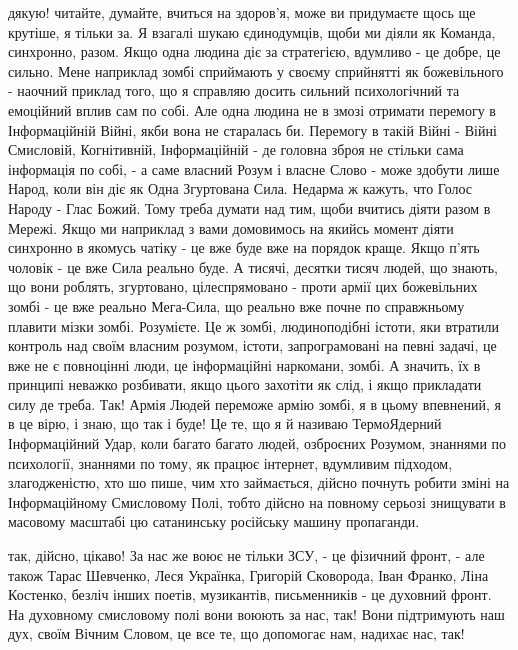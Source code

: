 дякую! читайте, думайте, вчиться на здоров'я, може ви придумаєте щось ще
крутіше, я тільки за. Я взагалі шукаю єдинодумців, щоби ми діяли як Команда,
синхронно, разом. Якщо одна людина діє за стратегією, вдумливо - це добре, це
сильно. Мене наприклад зомбі сприймають у своєму сприйнятті як божевільного -
наочний приклад того, що я справляю досить сильний психологічний та емоційний
вплив сам по собі. Але одна людина не в змозі отримати перемогу в Інформаційній
Війні, якби вона не старалась би. Перемогу в такій Війні - Війні Смисловій,
Когнітивній, Інформаційній - де головна зброя не стільки сама інформація по
собі, - а саме власний Розум і  власне Слово - може здобути лише Народ, коли
він діє як Одна Згуртована Сила. Недарма ж кажуть, что Голос Народу - Глас
Божий. Тому треба думати над тим, щоби вчитись діяти разом в Мережі. Якщо ми
наприклад з вами домовимось на якийсь момент діяти синхронно в якомусь чатіку -
це вже буде вже на порядок краще. Якщо п'ять чоловік - це вже Сила реально
буде. А тисячі, десятки тисяч людей, що знають, що вони роблять, згуртовано,
цілеспрямовано - проти армії цих божевільних зомбі - це вже реально Мега-Сила,
що реально вже почне по справжньому плавити мізки зомбі. Розумієте. Це ж зомбі,
людиноподібні істоти, яки втратили контроль над своїм власним розумом, істоти,
запрограмовані на певні задачі, це вже не є повноцінні люди, це інформаційні
наркомани, зомбі. А значить,  їх в принципі неважко розбивати, якщо цього
захотіти як слід, і якщо прикладати силу де треба. Так! Армія Людей переможе
армію зомбі, я в цьому впевнений, я в це вірю, і знаю, що так і буде! Це те, що
я й називаю ТермоЯдерний Інформаційний Удар, коли багато багато людей,
озброєних Розумом, знаннями по психології, знаннями по тому, як працює
інтернет, вдумливим підходом, злагодженістю, хто шо пише, чим хто займається,
дійсно почнуть робити зміні на Інформаційному Смисловому Полі, тобто дійсно на
повному серьозі знищувати в масовому масштабі цю сатанинську російську машину
пропаганди.

так, дійсно, цікаво! За нас же воює не тільки ЗСУ, - це фізичний фронт, - але
також Тарас Шевченко, Леся Українка, Григорій Сковорода, Іван Франко, Ліна
Костенко, безліч інших поетів, музикантів, письменників - це духовний фронт. На
духовному смисловому полі вони воюють за нас, так! Вони підтримують наш дух,
своїм Вічним Словом, це все те, що допомогає нам, надихає нас, так!

